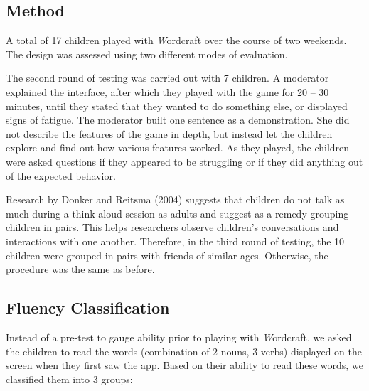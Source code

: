 \documentclass{sigchi-ext}
\begin{document}
\subsection{Method}
A total of 17 children played with \emph Wordcraft over the course of two weekends.  The design was assessed using two different modes of evaluation.

The second round of testing was carried out with 7 children. A moderator explained the interface, after which they played with the game for 20 – 30 minutes, until they stated that they wanted to do something else, or displayed signs of fatigue. The moderator built one sentence as a demonstration. She did not describe the features of the game in depth, but instead let the children explore and find out how various features worked. As they played, the children were asked questions if they appeared to be struggling or if they did anything out of the expected behavior.

Research by Donker and Reitsma (2004) suggests that children do not talk as much during a think aloud session as adults and suggest as a remedy grouping children in pairs.  This helps researchers observe children’s conversations and interactions with one another.  Therefore, in the third round of testing, the 10 children were grouped in pairs with friends of similar ages.  Otherwise, the  procedure was the same as before.

\subsection{Fluency Classification}
Instead of a pre-test to gauge ability prior to playing with \emph Wordcraft, we asked the children to read the words (combination of 2 nouns, 3 verbs) displayed on the screen when they first saw the app. Based on their ability to read these words, we classified them into 3 groups:
\end{document}
